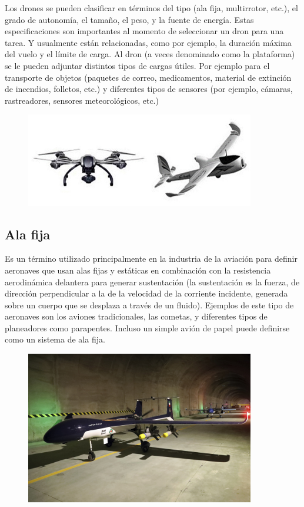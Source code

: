 \documentclass{article}
\begin{document}
Los drones se pueden clasificar en términos del tipo (ala fija, multirrotor, etc.), el grado de autonomía, el tamaño, el peso, y la fuente de energía. Estas especificaciones son importantes al momento de seleccionar un dron para una tarea. Y usualmente están relacionadas, como por ejemplo, la duración máxima del vuelo y el límite de carga. Al dron (a veces denominado como la plataforma) se le pueden adjuntar distintos tipos de cargas útiles. Por ejemplo para el transporte de objetos (paquetes de correo, medicamentos, material de extinción de incendios, folletos, etc.) y diferentes tipos de sensores (por ejemplo, cámaras, rastreadores, sensores meteorológicos, etc.)\\

\begin{figure}[h]
\includegraphics[width=10cm]{images/vant.jpg}
\centering
\end{figure}

\newpage
\subsection{Ala fija}

Es un término utilizado principalmente en la industria de la aviación para definir aeronaves que usan alas fijas y estáticas en combinación con la resistencia aerodinámica delantera para generar sustentación (la sustentación es la fuerza, de dirección perpendicular a la de la velocidad de la corriente incidente, generada sobre un cuerpo que se desplaza a través de un fluido). Ejemplos de este tipo de aeronaves son los aviones tradicionales, las cometas, y diferentes tipos de planeadores como parapentes. Incluso un simple avión de papel puede definirse como un sistema de ala fija.\\

\begin{figure}[h]
\includegraphics[width=10cm]{images/drone_alafija.jpg}
\centering
\end{figure}
\end{document}
